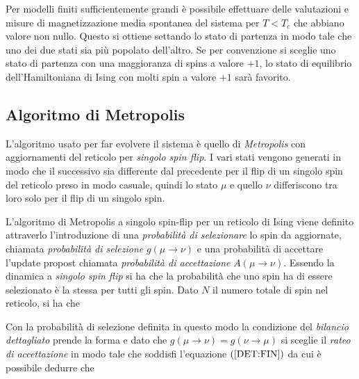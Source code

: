 \documentclass[a4paper,12pt]{article}
\begin{document}
Per modelli finiti sufficientemente grandi è possibile effettuare delle valutazioni e misure di magnetizzazione media spontanea del sistema per $T < T_c$ che abbiano valore non nullo. Questo si ottiene settando lo stato di partenza in modo tale che uno dei due stati sia più popolato dell’altro. Se per convenzione si sceglie uno stato di partenza con una maggioranza di spins a valore $+1$, lo stato di equilibrio dell’Hamiltoniana di Ising con molti spin a valore $+1$ sarà favorito. 

\subsection{Algoritmo di Metropolis}
L'algoritmo usato per far evolvere il sistema \`e quello di \emph{Metropolis} con aggiornamenti del reticolo per \emph{singolo spin flip}. I vari stati vengono generati in modo che il successivo sia differente dal precedente per il flip di un singolo spin del reticolo preso in modo casuale, quindi lo stato $\mu$ e quello $\nu$ differiscono tra loro solo per il flip di un singolo spin. 

L'algoritmo di Metropolis a singolo spin-flip per un reticolo di Ising viene definito attraverlo l'introduzione di una \emph{probabilit\`a di selezionare} lo spin da aggiornate, chiamata \emph{probabilit\`a di selezione} $g(\mu \to \nu)$ e una probabilit\`a di accettare l'update propost chiamata \emph{probabilit\`a di accettazione} $A(\mu \to \nu)$. Essendo la dinamica a \emph{singolo spin flip} si ha che la probabilit\`a che uno spin ha di essere selezionato \`e la stessa per tutti gli spin. Dato $N$ il numero totale di spin nel reticolo, si ha che

Con la probabilità di selezione definita in questo modo la condizione del \emph{bilancio dettagliato} prende la forma
e dato che $g(\mu\to\nu)=g(\nu\to\mu)$ si sceglie il \emph{rateo di accettazione} in modo tale che soddisfi l'equazione $(\ref{DET:FIN})$
da cui è possibile dedurre che
\end{document}
